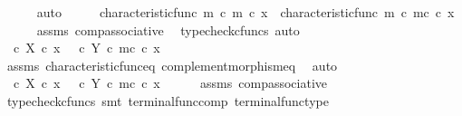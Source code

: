 \begin{isabellebody}
\ \ \ \ \isamarkupfalse%
\ auto\isanewline
\ \ \isamarkupfalse%
\ \isamarkupfalse%
\ {\isachardoublequoteopen}{\isacharparenleft}{\kern0pt}characteristic{\isacharunderscore}{\kern0pt}func\ m\ {\isasymcirc}\isactrlsub c\ m{\isacharparenright}{\kern0pt}\ {\isasymcirc}\isactrlsub c\ x\ {\isacharequal}{\kern0pt}\ {\isacharparenleft}{\kern0pt}characteristic{\isacharunderscore}{\kern0pt}func\ m\ {\isasymcirc}\isactrlsub c\ m\isactrlsup c{\isacharparenright}{\kern0pt}\ {\isasymcirc}\isactrlsub c\ x{\isacharprime}{\kern0pt}{\isachardoublequoteclose}\isanewline
\ \ \ \ \isamarkupfalse%
\ assms\ comp{\isacharunderscore}{\kern0pt}associative{}\ \isamarkupfalse%
\ {\isacharparenleft}{\kern0pt}typecheck{\isacharunderscore}{\kern0pt}cfuncs{\isacharcomma}{\kern0pt}\ auto{\isacharparenright}{\kern0pt}\isanewline
\ \ \isamarkupfalse%
\ \isamarkupfalse%
\ {\isachardoublequoteopen}{\isacharparenleft}{\kern0pt}{\isasymt}\ {\isasymcirc}\isactrlsub c\ {\isasymbeta}\isactrlbsub X\isactrlesub {\isacharparenright}{\kern0pt}\ {\isasymcirc}\isactrlsub c\ x\ {\isacharequal}{\kern0pt}\ {\isacharparenleft}{\kern0pt}{\isacharparenleft}{\kern0pt}{\isasymf}\ {\isasymcirc}\isactrlsub c\ {\isasymbeta}\isactrlbsub Y\isactrlesub {\isacharparenright}{\kern0pt}\ {\isasymcirc}\isactrlsub c\ m\isactrlsup c{\isacharparenright}{\kern0pt}\ {\isasymcirc}\isactrlsub c\ x{\isacharprime}{\kern0pt}{\isachardoublequoteclose}\isanewline
\ \ \ \ \isamarkupfalse%
\ assms\ characteristic{\isacharunderscore}{\kern0pt}func{\isacharunderscore}{\kern0pt}eq\ complement{\isacharunderscore}{\kern0pt}morphism{\isacharunderscore}{\kern0pt}eq\ \isamarkupfalse%
\ auto\isanewline
\ \ \isamarkupfalse%
\ \isamarkupfalse%
\ {\isachardoublequoteopen}{\isasymt}\ {\isasymcirc}\isactrlsub c\ {\isasymbeta}\isactrlbsub X\isactrlesub \ {\isasymcirc}\isactrlsub c\ x\ {\isacharequal}{\kern0pt}\ {\isasymf}\ {\isasymcirc}\isactrlsub c\ {\isasymbeta}\isactrlbsub Y\isactrlesub \ {\isasymcirc}\isactrlsub c\ m\isactrlsup c\ {\isasymcirc}\isactrlsub c\ x{\isacharprime}{\kern0pt}{\isachardoublequoteclose}\isanewline
\ \ \ \ \isamarkupfalse%
\ assms\ comp{\isacharunderscore}{\kern0pt}associative{}\ \isamarkupfalse%
\ {\isacharparenleft}{\kern0pt}typecheck{\isacharunderscore}{\kern0pt}cfuncs{\isacharcomma}{\kern0pt}\ smt\ terminal{\isacharunderscore}{\kern0pt}func{\isacharunderscore}{\kern0pt}comp\ terminal{\isacharunderscore}{\kern0pt}func{\isacharunderscore}{\kern0pt}type{\isacharparenright}{\kern0pt}\isanewline

\end{isabellebody}
